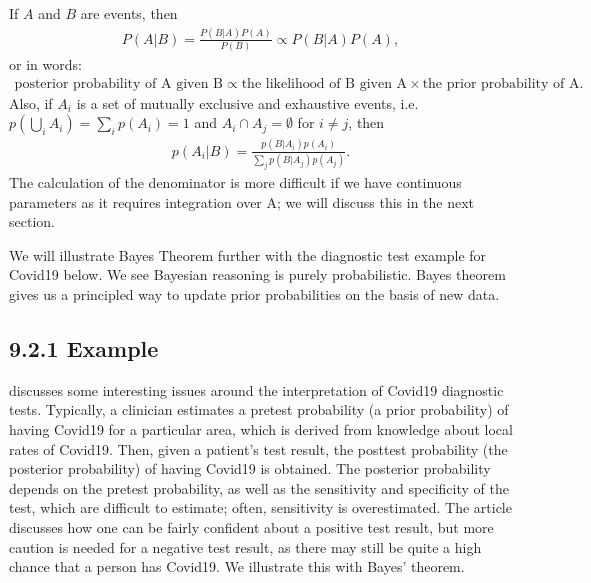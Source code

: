 \documentclass[letterpaper,10pt,english]{jupyterBook}
\begin{document}
\sphinxAtStartPar
If \(A\) and \(B\) are events, then
\begin{equation*}
\begin{split}
P(A|B) = \frac{ P(B|A) P(A) } {P(B)} \propto P(B|A) P(A),
\end{split}
\end{equation*}
\sphinxAtStartPar
or in words:
\begin{equation*}
\begin{split}
\mbox{posterior probability of A given B} \propto \mbox{the likelihood of B given A} \times \mbox{the prior probability of A}.
\end{split}
\end{equation*}
\sphinxAtStartPar
Also, if \(A_i\) is a set of mutually exclusive and exhaustive events, i.e. \( p( \bigcup\limits_i A_i ) = \sum\limits_i p(A_i) = 1\) and \(A_i \cap A_j = \emptyset\) for \(i \neq j\), then
\begin{equation*}
\begin{split}
p(A_i|B) = \frac{ p(B|A_i) p(A_i) } {\sum\limits_j p(B|A_j) p(A_j) }.
\end{split}
\end{equation*}
\sphinxAtStartPar
The calculation of the denominator is more difficult if we have continuous parameters as it requires integration over A; we will discuss this in the next section.

\sphinxAtStartPar
We will illustrate Bayes Theorem further with the diagnostic test example for Covid\sphinxhyphen{}19 below. We see Bayesian reasoning is purely probabilistic. Bayes theorem gives us a principled way to update prior probabilities on the basis of new data.


\subsection{9.2.1 Example}
\label{\detokenize{09.c. Bayesian Statistics I:example}}
\sphinxAtStartPar
{} discusses some interesting issues around the interpretation of Covid\sphinxhyphen{}19 diagnostic tests. Typically, a clinician estimates a pre\sphinxhyphen{}test probability (a prior probability) of having Covid\sphinxhyphen{}19 for a particular area, which is derived from knowledge about local rates of Covid\sphinxhyphen{}19. Then, given a patient’s test result, the post\sphinxhyphen{}test probability (the posterior probability) of having Covid\sphinxhyphen{}19 is obtained. The posterior probability depends on the pre\sphinxhyphen{}test probability, as well as the sensitivity and specificity of the test, which are difficult to estimate; often, sensitivity is over\sphinxhyphen{}estimated. The article discusses how one can be fairly confident about a positive test result, but more caution is needed for a negative test result, as there may still be quite a high chance that a person has Covid\sphinxhyphen{}19. We illustrate this with Bayes’ theorem.
\end{document}
